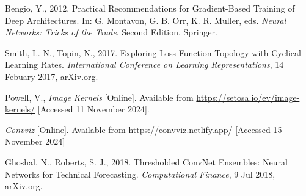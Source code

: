 \documentclass{article}
\begin{document}
\noindent
Bengio, Y., 2012. Practical Recommendations for Gradient-Based Training of Deep Architectures. In: G. Montavon, G. B. Orr, K. R. Muller, eds. \textit{Neural Networks: Tricks of the Trade}. Second Edition. Springer.

\noindent
Smith, L. N., Topin, N., 2017. Exploring Loss Function Topology with Cyclical Learning Rates. \textit{International Conference on Learning Representations}, 14 Febuary 2017, arXiv.org.

\noindent
Powell, V., \textit{Image Kernels} [Online]. Available from \href{https://setosa.io/ev/image-kernels/}{https://setosa.io/ev/image-kernels/} [Accessed 11 November 2024].

\noindent
\textit{Convviz} [Online]. Available from \href{https://convviz.netlify.app/}{https://convviz.netlify.app/} [Accessed 15 November 2024]

\noindent
Ghoshal, N., Roberts, S. J., 2018. Thresholded ConvNet Ensembles: Neural Networks for Technical Forecasting. \textit{Computational Finance}, 9 Jul 2018, arXiv.org.
\end{document}
